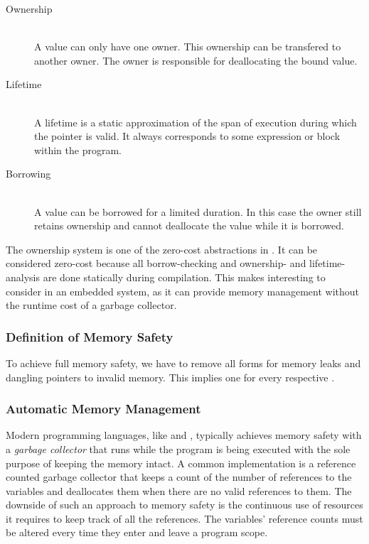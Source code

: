\begin{description}
\item [Ownership] \hfill \\
  A value can only have one owner.
  This ownership can be transfered to another owner.
  The owner is responsible for deallocating the bound value.

\item [Lifetime] \hfill \\
  A lifetime is a static approximation of the span of execution during which the pointer is valid.
  It always corresponds to some expression or block within the program.

\item [Borrowing] \hfill \\
  A value can be borrowed for a limited duration.
  In this case the owner still retains ownership and cannot deallocate the value while it is borrowed.

\end{description}

The ownership system is one of the zero-cost abstractions in {\rust}.
It can be considered zero-cost because all borrow-checking and ownership- and lifetime-analysis are done statically during compilation.
This makes {\rust} interesting to consider in an embedded system, as it can provide memory management without the runtime cost of a garbage collector.

\subsubsection{Definition of Memory Safety}
To achieve full memory safety, we have to remove all forms for memory leaks and dangling pointers to invalid memory.
This implies one  for every respective .


\subsubsection{Automatic Memory Management}
Modern programming languages, like {\Java} and {}, typically achieves memory safety with a \emph{garbage collector} that runs while the program is being executed with the sole purpose of keeping the memory intact.
A common implementation is a reference counted garbage collector \cite{Wilson1992} that keeps a count of the number of references to the variables and deallocates them when there are no valid references to them.
The downside of such an approach to memory safety is the continuous use of resources it requires to keep track of all the references.
The variables' reference counts must be altered every time they enter and leave a program scope.

